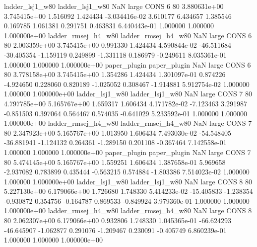     ladder_lsj1_w80     ladder_lsj1_w80                   NaN      large     CONS                 6 80 3.880631e+00   3.745415e+00      1.516092       1.424434 -3.034416e-02      3.610177      6.434657     1.385546       0.169785  1.061381   0.291751     0.463831   6.440443e-01            1.000000        1.000000        1.000000e+00
ladder_rmsej_h4_w80 ladder_rmsej_h4_w80                   NaN      large     CONS                 6 80 2.003359e+00   3.745415e+00      0.991330       1.424434  4.590844e-02    -46.511684    -30.405354    -1.159119       0.249899 -1.331118   0.186979    -0.249611   8.035361e-01            1.000000        1.000000        1.000000e+00
       paper_plugin        paper_plugin                   NaN      large     CONS                 6 80 3.778158e+00   3.745415e+00      1.354286       1.424434  1.301097e-01      0.874226     -4.924650     0.228060       0.820189 -1.025052   0.308467    -1.914881   5.912754e-02            1.000000        1.000000        1.000000e+00
    ladder_lsj1_w80     ladder_lsj1_w80                   NaN      large     CONS                 7 80 4.797785e+00   5.165767e+00      1.659317       1.606434  4.171782e-02     -7.123463      3.291987    -0.851503       0.397064  0.564467   0.574035    -0.641029   5.233592e-01            1.000000        1.000000        1.000000e+00
ladder_rmsej_h4_w80 ladder_rmsej_h4_w80                   NaN      large     CONS                 7 80 2.347923e+00   5.165767e+00      1.013950       1.606434  7.493030e-02    -54.548405    -36.881941    -1.124132       0.264361 -1.289150   0.201108    -0.367464   7.142558e-01            1.000000        1.000000        1.000000e+00
       paper_plugin        paper_plugin                   NaN      large     CONS                 7 80 5.474145e+00   5.165767e+00      1.559251       1.606434  1.387658e-01      5.969658     -2.937082     0.783899       0.435444 -0.563215   0.574884    -1.803386   7.514023e-02            1.000000        1.000000        1.000000e+00
    ladder_lsj1_w80     ladder_lsj1_w80                   NaN      large     CONS                 8 80 5.227130e+00   6.179066e+00      1.726680       1.748330  5.414233e-02    -15.405833     -1.238354    -0.930872       0.354756 -0.164787   0.869533    -0.849924   3.979360e-01            1.000000        1.000000        1.000000e+00
ladder_rmsej_h4_w80 ladder_rmsej_h4_w80                   NaN      large     CONS                 8 80 2.062307e+00   6.179066e+00      0.932806       1.748330  1.045365e-01    -66.624293    -46.645907    -1.062877       0.291076 -1.209467   0.230091    -0.405749   6.860239e-01            1.000000        1.000000        1.000000e+00
